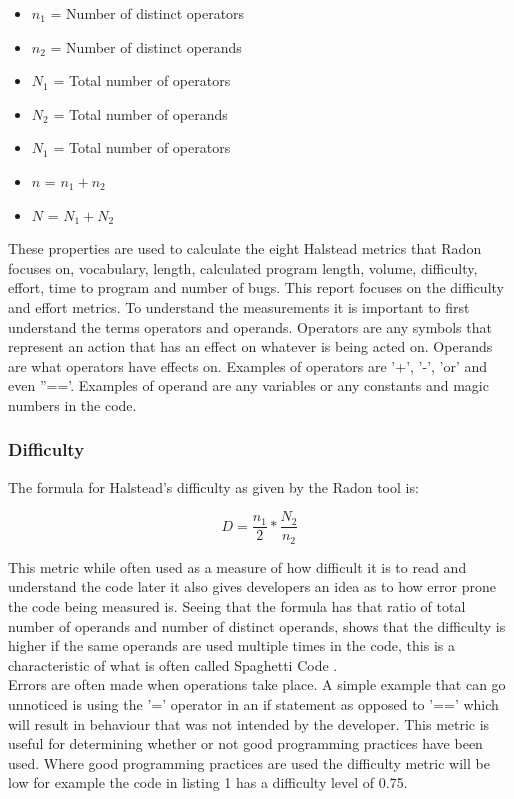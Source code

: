 \documentclass[11pt,journal, a4paper]{IEEEtran}
\begin{document}
\begin{itemize}
\item $n_{1}$ = Number of distinct operators
\item $n_{2}$ = Number of distinct operands
\item $N_{1}$ = Total number of operators
\item $N_{2}$ = Total number of operands
\item $N_{1}$ = Total number of operators
\item $n$ = $n_{1} + n_{2}$
\item $N$ = $N_{1} + N_{2}$
\end{itemize}

\noindent
These properties are used to calculate the eight Halstead metrics that Radon focuses on, vocabulary, length, calculated program length, volume, difficulty, effort, time to program and number of bugs. This report focuses on the difficulty and effort metrics. To understand the measurements it is important to first understand the terms operators and operands. Operators are any symbols that represent an action that has an effect on whatever is being acted on. Operands are what operators have effects on. Examples of operators are '+', '-', 'or' and even ''=='. Examples of operand are any variables or any constants and magic numbers in the code. 

\subsubsection{Difficulty}
\noindent
The formula for Halstead's difficulty as given by the Radon tool is:

\begin{equation}
 D  = \frac{n_{1}}{2}*\frac{N_{2}}{n_{2}}
\end{equation}

This metric while often used as a measure of how difficult it is to read and understand the code later it also gives developers an idea as to how error prone the code being measured is. Seeing that the formula has that ratio of total number of operands and number of distinct operands, shows that the difficulty is higher if the same operands are used multiple times in the code, this is a characteristic of what is often called Spaghetti Code \cite{SPAG}. \\

\noindent
Errors are often made when operations take place. A simple example that can go unnoticed is using the '=' operator in an if statement as opposed to '==' which will result in behaviour that was not intended by the developer. This metric is useful for determining whether or not good programming practices have been used. Where good programming practices are used the difficulty metric will be low for example the code in listing 1 has a difficulty level of 0.75. 
\end{document}
